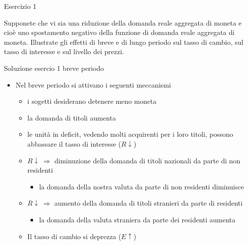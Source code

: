 \fi

\begin{frame}{Esercizio 1}
\protect\hypertarget{esercizio-1}{}

Supponete che vi sia una riduzione della domanda reale aggregata di
moneta e cioè uno spostamento negativo della funzione di domanda reale
aggregata di moneta. Illustrate gli effetti di breve e di lungo periodo
sul tasso di cambio, sul tasso di interesse e sul livello dei prezzi.

\end{frame}

\ifshowsolution

\begin{frame}{Soluzione esercio 1 breve periodo}
\protect\hypertarget{soluzione-esercio-1-breve-periodo}{}

\begin{itemize}
\item
  Nel breve periodo si attivano i seguenti meccanismi

  \begin{itemize}
  \item
    i sogetti desiderano detenere meno moneta
  \item
    la domanda di titoli aumenta
  \item
    le unità in deficit, vedendo molti acquirenti per i loro titoli,
    possono abbassare il tasso di interesse (\(R\downarrow\))
  \item
    \(R\downarrow \ \Rightarrow\) diminuzione della domanda di titoli
    nazionali da parte di non residenti

    \begin{itemize}
     
    \item
      la domanda della nostra valuta da parte di non residenti
      diminuisce
    \end{itemize}
  \item
    \(R\downarrow \ \Rightarrow\) aumento della domanda di titoli
    stranieri da parte di residenti

    \begin{itemize}
     
    \item
      la domanda della valuta straniera da parte dei residenti aumenta
    \end{itemize}
  \item
    Il tasso di cambio si deprezza (\(E \uparrow\))
  \end{itemize}
\end{itemize}

\end{frame}

